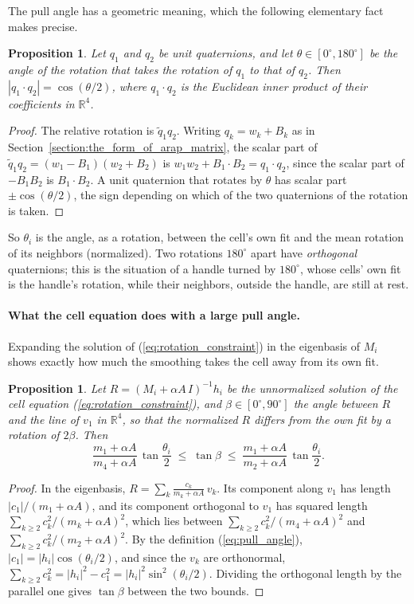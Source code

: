 \documentclass{birkjour}
\newtheorem{prop}[thm]{Proposition}
\theoremstyle{remark}
\numberwithin{equation}{section}
\begin{document}
The pull angle has a geometric meaning, which the following elementary fact makes precise.
\begin{prop}
\label{prop:quaternion_angle}
Let $q_1$ and $q_2$ be unit quaternions, and let $\theta \in [0^\circ, 180^\circ]$ be the angle of the rotation that takes the rotation of $q_1$ to that of $q_2$. Then $|q_1 \cdot q_2| = \cos(\theta / 2)$, where $q_1 \cdot q_2$ is the Euclidean inner product of their coefficients in $\mathbb R^4$.
\end{prop}
\begin{proof}
The relative rotation is $\tilde q_1 q_2$. Writing $q_k = w_k + B_k$ as in Section~\ref{section:the_form_of_arap_matrix}, the scalar part of $\tilde q_1 q_2 = (w_1 - B_1)(w_2 + B_2)$ is $w_1 w_2 + B_1 \cdot B_2 = q_1 \cdot q_2$, since the scalar part of $-B_1 B_2$ is $B_1 \cdot B_2$. A unit quaternion that rotates by $\theta$ has scalar part $\pm \cos(\theta/2)$, the sign depending on which of the two quaternions of the rotation is taken.
\end{proof}
So $\theta_i$ is the angle, as a rotation, between the cell's own fit and the mean rotation of its neighbors (normalized). Two rotations $180^\circ$ apart have \emph{orthogonal} quaternions; this is the situation of a handle turned by $180^\circ$, whose cells' own fit is the handle's rotation, while their neighbors, outside the handle, are still at rest.

\paragraph{What the cell equation does with a large pull angle.} Expanding the solution of (\ref{eq:rotation_constraint}) in the eigenbasis of $M_i$ shows exactly how much the smoothing takes the cell away from its own fit.
\begin{prop}
\label{prop:lag}
Let $R = (M_i + \alpha A \, I)^{-1} h_i$ be the unnormalized solution of the cell equation (\ref{eq:rotation_constraint}), and $\beta \in [0^\circ, 90^\circ]$ the angle between $R$ and the line of $v_1$ in $\mathbb R^4$, so that the normalized $R$ differs from the own fit by a rotation of $2 \beta$. Then
\begin{equation}
\label{eq:lag}
\frac{m_1 + \alpha A}{m_4 + \alpha A} \, \tan \frac{\theta_i}{2} \;\leq\; \tan \beta \;\leq\; \frac{m_1 + \alpha A}{m_2 + \alpha A} \, \tan \frac{\theta_i}{2} .
\end{equation}
\end{prop}
\begin{proof}
In the eigenbasis, $R = \sum_k \frac{c_k}{m_k + \alpha A} \, v_k$. Its component along $v_1$ has length $|c_1| / (m_1 + \alpha A)$, and its component orthogonal to $v_1$ has squared length $\sum_{k \geq 2} c_k^2 / (m_k + \alpha A)^2$, which lies between $\sum_{k \geq 2} c_k^2 / (m_4 + \alpha A)^2$ and $\sum_{k \geq 2} c_k^2 / (m_2 + \alpha A)^2$. By the definition (\ref{eq:pull_angle}), $|c_1| = |h_i| \cos(\theta_i / 2)$, and since the $v_k$ are orthonormal, $\sum_{k \geq 2} c_k^2 = |h_i|^2 - c_1^2 = |h_i|^2 \sin^2(\theta_i / 2)$. Dividing the orthogonal length by the parallel one gives $\tan \beta$ between the two bounds.
\end{proof}
\end{document}
